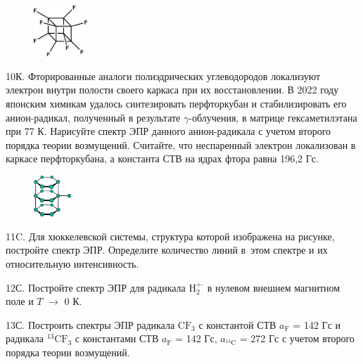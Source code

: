 \par
\begin{figure} %
   \centering
    \vspace{0.55ex}
    \includegraphics[width=20mm]{images/Fig_2_7_10.png}
    \vspace{-3ex}
\end{figure}
10К. Фторированные аналоги полиэдрических углеводородов локализуют электрон внутри полости своего каркаса при их восстановлении. В 2022 году японским химикам удалось синтезировать перфторкубан и стабилизировать его анион-радикал, полученный в результате $\gamma$-облучения, в матрице гексаметилэтана при 77 К. Нарисуйте спектр ЭПР данного анион-радикала с учетом второго порядка теории возмущений. Считайте, что неспаренный электрон локализован в каркасе перфторкубана, а константа СТВ на ядрах фтора равна 196,2 Гс.
\par
\begin{figure} %
   \centering
    \vspace{-4ex}
    \includegraphics[width=14mm]{images/Fig_2_7_12.png}
    \vspace{-4ex}
\end{figure}
11C. Для хюккелевской системы, структура которой изображена на рисунке, постройте спектр ЭПР. Определите количество линий в~этом спектре и их относительную интенсивность.
\par
12С. Постройте спектр ЭПР для радикала $\text{H}_2^{+ \boldsymbol{\cdot}}$ в нулевом внешнем магнитном поле и $T$ $\rightarrow$ 0 К.
\par
13С. Построить спектры ЭПР радикала $\text{CF}_3$ с константой СТВ $a_{\text{F}}$ = 142 Гс и радикала $^{13}\text{CF}_3$ с константами СТВ $a_{\text{F}}$ = 142 Гс, $a_{^{13}\text{C}}$ = 272 Гс с учетом второго порядка теории возмущений.
\par
